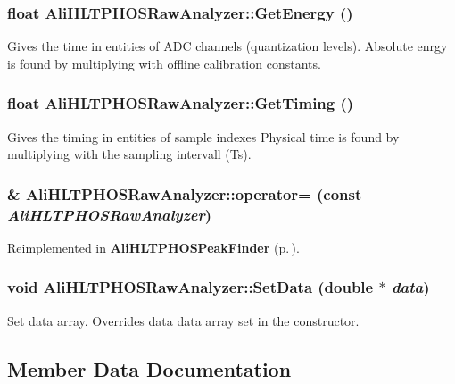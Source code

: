 \subsubsection{\setlength{\rightskip}{0pt plus 5cm}float Ali\-HLTPHOSRaw\-Analyzer::Get\-Energy ()}\label{classAliHLTPHOSRawAnalyzer_a7}


Gives the time in entities of ADC channels (quantization levels). Absolute enrgy is found by multiplying with offline calibration constants. 
\subsubsection{\setlength{\rightskip}{0pt plus 5cm}float Ali\-HLTPHOSRaw\-Analyzer::Get\-Timing ()}\label{classAliHLTPHOSRawAnalyzer_a6}


Gives the timing in entities of sample indexes Physical time is found by multiplying with the sampling intervall (Ts). 
\subsubsection{\& Ali\-HLTPHOSRaw\-Analyzer::operator= (const  {\em Ali\-HLTPHOSRaw\-Analyzer})}\label{classAliHLTPHOSRawAnalyzer_a3}




Reimplemented in {\bf Ali\-HLTPHOSPeak\-Finder} {\rm (p.\,\pageref{classAliHLTPHOSPeakFinder_a3})}.
\subsubsection{\setlength{\rightskip}{0pt plus 5cm}void Ali\-HLTPHOSRaw\-Analyzer::Set\-Data (double $\ast$ {\em data})}\label{classAliHLTPHOSRawAnalyzer_a8}


Set data array. Overrides data data array set in the constructor. 

\subsection{Member Data Documentation}
